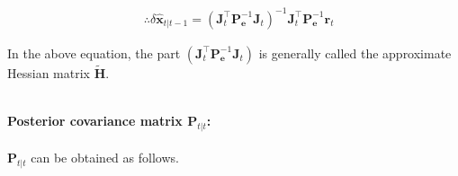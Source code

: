 \documentclass[10pt]{article}
\begin{document}
\begin{equation}  
	\boxed{ \begin{aligned} & \therefore \delta \hat{\mathbf{x}}_{t|t-1} = (\mathbf{J}_{t}^{\intercal} \mathbf{P}_{\mathbf{e}}^{-1}\mathbf{J}_{t})^{-1} \mathbf{J}_{t}^{\intercal} \mathbf{P}_{\mathbf{e}}^{-1} \mathbf{r}_{t} 
	\end{aligned}  }
\end{equation}

In the above equation, the part $(\mathbf{J}_{t}^{\intercal} \mathbf{P}_{\mathbf{e}}^{-1} \mathbf{J}_{t})$ is generally called the approximate Hessian matrix $\tilde{\mathbf{H}}$.

~\\
\textbf{Posterior covariance matrix $\mathbf{P}_{t|t}$:}
~\\ \\
$\mathbf{P}_{t|t}$ can be obtained as follows.
\end{document}
